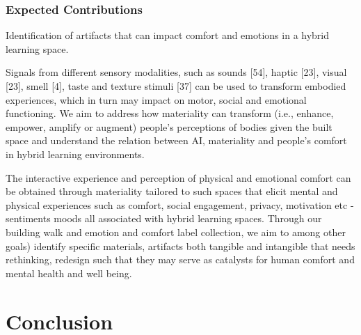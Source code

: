 \documentclass[acmconf, anonymous, review]{acmart}
\begin{document}
\subsubsection{Expected Contributions}
Identification of artifacts that can impact comfort and emotions in a hybrid learning space. 


Signals from different sensory modalities, such as sounds [54], haptic [23], visual [23], smell [4], taste
and texture stimuli [37] can be used to transform embodied experiences, which in turn may impact on motor, social and
emotional functioning. We aim to address how materiality can transform (i.e., enhance, empower, amplify or augment) people’s perceptions of bodies given the built space and understand the relation between AI, materiality and people’s comfort in hybrid learning environments. 


The interactive experience and perception of physical and emotional comfort can be obtained through materiality tailored to such spaces that elicit mental and physical experiences such as comfort, social engagement, privacy, motivation etc - sentiments moods all associated with hybrid learning spaces.  Through our building walk and emotion and comfort label collection, we aim to among other goals) identify specific materials, artifacts both tangible and intangible that 
needs rethinking, redesign such that they may serve as catalysts for human comfort and mental health and well being. 





\section{Conclusion}

\todototoc
{}






\end{document}
